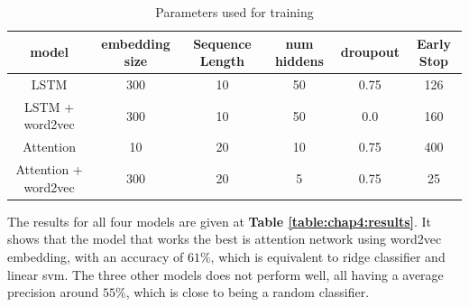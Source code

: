 \begin{table}[h]
	\begin{tabular}{|c|ccccc|}
	\hline
	model & embedding size & Sequence Length & num hiddens & droupout & Early Stop\\
	\hline
	LSTM & 300 & 10 & 50 & 0.75 & 126\\
	LSTM + word2vec & 300 & 10 & 50 & 0.0 & 160\\
	Attention & 10 & 20 & 10 & 0.75 & 400\\
	Attention + word2vec & 300 & 20 & 5 & 0.75 & 25\\
	\hline
	\end{tabular}
	\caption{Parameters used for training}
	\label{table:chap4:param}
\end{table}
The results for all four models are given at \textbf{Table \ref{table:chap4:results}}. It shows that the model that works the best is attention network using word2vec embedding, with an accuracy of $61\%$, which is equivalent to ridge classifier and linear svm. The three other models does not perform well, all having a average precision around $55\%$, which is close to being a random classifier. 

